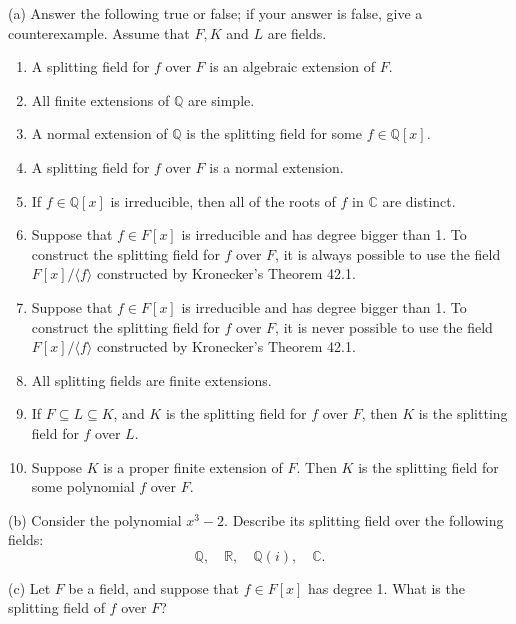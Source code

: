 \begin{problem}[Warmup]{(a)}
    Answer the following true or false; if your answer is false, give a counterexample. Assume that $F, K$ and $L$ are fields.
    \begin{enumerate}
        \item[(a)] A splitting field for $f$ over $F$ is an algebraic extension of $F$.
        \item[(b)] All finite extensions of $\mathbb{Q}$ are simple.
        \item[(c)] A normal extension of $\mathbb{Q}$ is the splitting field for some $f \in \mathbb{Q}[x]$.
        \item[(d)] A splitting field for $f$ over $F$ is a normal extension.
        \item[(e)] If $f \in \mathbb{Q}[x]$ is irreducible, then all of the roots of $f$ in $\mathbb{C}$ are distinct.
        \item[(f)] Suppose that $f \in F[x]$ is irreducible and has degree bigger than 1. To construct the splitting field for $f$ over $F$, it is always possible to use the field $F[x]/\langle f \rangle$ constructed by Kronecker's Theorem 42.1.
        \item[(g)] Suppose that $f \in F[x]$ is irreducible and has degree bigger than 1. To construct the splitting field for $f$ over $F$, it is never possible to use the field $F[x]/\langle f \rangle$ constructed by Kronecker's Theorem 42.1.
        \item[(h)] All splitting fields are finite extensions.
        \item[(i)] If $F \subseteq L \subseteq K$, and $K$ is the splitting field for $f$ over $F$, then $K$ is the splitting field for $f$ over $L$.
        \item[(j)] Suppose $K$ is a proper finite extension of $F$. Then $K$ is the splitting field for some polynomial $f$ over $F$.
    \end{enumerate}
\end{problem}
\unsolved

\begin{problem}[Warmup]{(b)}
    Consider the polynomial $x^3 - 2$. Describe its splitting field over the following fields: \[\mathbb{Q}, \quad \mathbb{R}, \quad \mathbb{Q}(i), \quad \mathbb{C}.\]
\end{problem}
\unsolved

\begin{problem}[Warmup]{(c)}
    Let $F$ be a field, and suppose that $f \in F[x]$ has degree 1. What is the splitting field of $f$ over $F$?
\end{problem}
\unsolved

